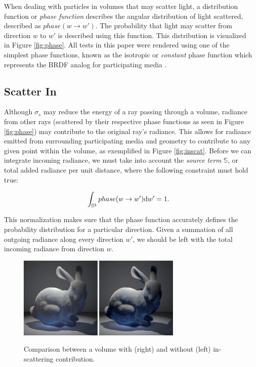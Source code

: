 \documentclass[12pt]{ucthesis}
\newcommand{\captionfonts}{\small\bf\ssp}
\begin{document}
When dealing with particles in volumes that may scatter light, a distribution function or \textit{phase function} describes the angular distribution of light scattered, described as $phase(w \to w')$.  The probability that light may scatter from direction $w$ to $w'$ is described using this function.  This distribution is visualized in Figure \ref{fig:phase}. All tests in this paper were rendered using one of the simplest phase functions, known as the isotropic or \textit{constant} phase function which represents the BRDF analog for participating media \cite{cerezo}.


\subsection{Scatter In}
Although $\sigma_{s}$ may reduce the energy of a ray passing through a volume, radiance from other rays (scattered by their respective phase functions as seen in Figure \ref{fig:phase}) may contribute to the original ray's radiance.  This allows for radiance emitted from surrounding participating media and geometry to contribute to any given point within the volume, as exemplified in Figure \ref{fig:inscat}.  Before we can integrate incoming radiance, we must take into account the \textit{source term} $\mathbb{S}$, or total added radiance per unit distance, where the following constraint must hold true:

\begin{equation}
\int_{\mathbb{S}^2}phase(w \to w')\textup{d}w' = 1.
\label{eq:source}
\end{equation}

This normalization makes sure that the phase function accurately defines the probability distribution for a particular direction.  Given a summation of all outgoing radiance along every direction $w'$, we should be left with the total incoming radiance from direction $w$.

\begin{figure}[h!]
    \centering
    \includegraphics[width=80mm]{img/inscat_comp.png}
    \captionfonts
    \caption{Comparison between a volume with (right) and without (left) in-scattering contribution.}
    \label{fig:inscat_comp}
\end{figure}
\end{document}

